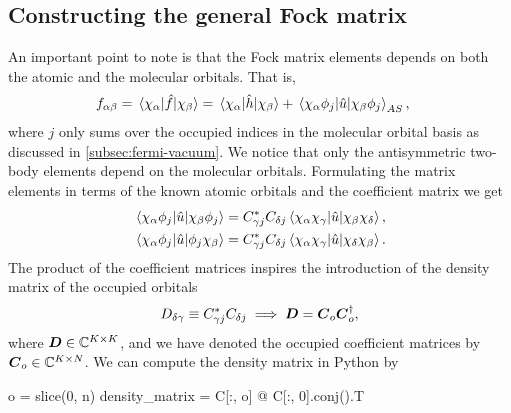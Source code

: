         \subsection{Constructing the general Fock matrix}
            An important point to note is that the Fock matrix elements depends
            on both the atomic and the molecular orbitals.
            That is,
            \begin{align}
                f_{\alpha\beta}
                &= \mel*{\chi_{\alpha}}{\hat{f}}{\chi_{\beta}}
                = \mel*{\chi_{\alpha}}{\hat{h}}{\chi_{\beta}}
                +
                \mel*{\chi_{\alpha}\phi_j}{\hat{u}}{\chi_{\beta}\phi_j}_{AS},
            \end{align}
            where $j$ only sums over the occupied indices in the molecular
            orbital basis as discussed in \autoref{subsec:fermi-vacuum}.
            We notice that only the antisymmetric two-body elements depend on
            the molecular orbitals.
            Formulating the matrix elements in terms of the known atomic orbitals
            and the coefficient matrix we get
            \begin{align}
                \mel*{\chi_{\alpha}\phi_j}{\hat{u}}{\chi_{\beta}\phi_j}
                &=
                C^{*}_{\gamma j} C_{\delta j}
                \mel*{\chi_{\alpha}\chi_{\gamma}}{\hat{u}}{\chi_{\beta}\chi_{\delta}},
                \\
                \mel*{\chi_{\alpha}\phi_j}{\hat{u}}{\phi_j\chi_{\beta}}
                &=
                C^{*}_{\gamma j} C_{\delta j}
                \mel*{\chi_{\alpha}\chi_{\gamma}}{\hat{u}}{\chi_{\delta}\chi_{\beta}}.
            \end{align}
            The product of the coefficient matrices inspires the introduction of
            the density matrix of the occupied orbitals
            \begin{align}
                D_{\delta\gamma} \equiv
                C^{*}_{\gamma j} C_{\delta j}
                \implies
                \boldsymbol{D} = \boldsymbol{C}_{o}\boldsymbol{C}^{\dagger}_{o},
                \label{eq:ghf-density-matrix}
            \end{align}
            where $\boldsymbol{D} \in \mathbb{C}^{K \times K}$, and we have denoted the
            occupied coefficient matrices by $\boldsymbol{C}_o \in \mathbb{C}^{K \times
            N}$.
            We can compute the density matrix in Python by
            \begin{python}
o = slice(0, n)
density_matrix = C[:, o] @ C[:, 0].conj().T
            \end{python}
